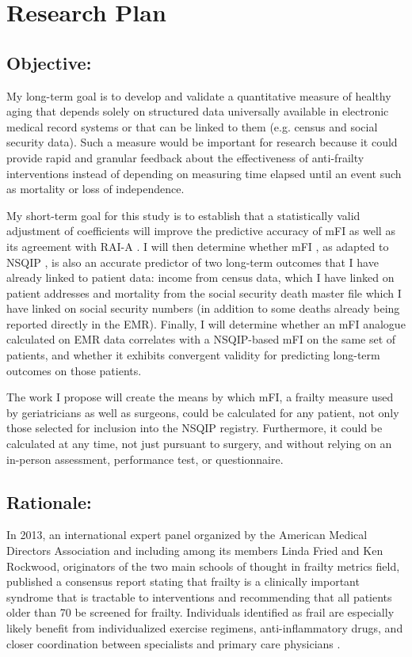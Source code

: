\section{Research Plan }\label{research-plan}


\subsection{Objective:}\label{objective}
  
My long-term goal is to develop and validate a quantitative measure of healthy aging that depends solely on structured data universally available in electronic medical record systems or that can be linked to them (e.g. census and social security data). Such a measure would be important for research because it could provide rapid and granular feedback about the effectiveness of anti-frailty interventions instead of depending on measuring time elapsed until an event such as mortality or loss of independence. 

My short-term goal for this study is to establish that a statistically valid adjustment of coefficients will improve the predictive accuracy of mFI as well as its agreement with RAI-A \cite{Isharwal_2016,Melin_2015}. I will then determine whether mFI \cite{Rockwood_2005}, as adapted to NSQIP \cite{Tsiouris_2013}, is also an accurate predictor of two long-term outcomes that I have already linked to patient data: income from census data, which I have linked on patient addresses and mortality from the social security death master file which I have linked on social security numbers (in addition to some deaths already being reported directly in the EMR). Finally, I will determine whether an mFI analogue calculated on EMR data correlates with a NSQIP-based mFI on the same set of patients, and whether it exhibits convergent validity for predicting long-term outcomes on those patients. 

The work I propose will create the means by which mFI, a frailty measure used by geriatricians as well as surgeons, could be calculated for any patient, not only those selected for inclusion into the NSQIP registry. Furthermore, it could be calculated at any time, not just pursuant to surgery, and without relying on an in-person assessment, performance test, or questionnaire.

\subsection{Rationale:}\label{rationale}
In 2013, an international expert panel organized by the American Medical Directors Association and including among its members Linda Fried and Ken Rockwood, originators of the two main schools of thought in frailty metrics field, published a consensus report \cite{Morley_2013} stating that frailty is a clinically important syndrome that is tractable to interventions and recommending that all patients older than 70 be screened for frailty. Individuals identified as frail are especially likely benefit from individualized exercise regimens, anti-inflammatory drugs, and closer coordination between specialists and primary care physicians \citep{16392724}.

